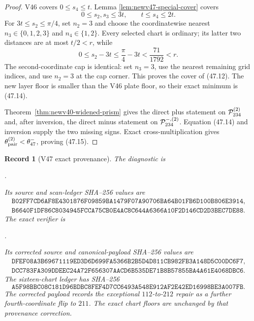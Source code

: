 \documentclass[11pt,oneside]{article}
\newtheorem{record}[theorem]{Record}
\theoremstyle{definition}
\theoremstyle{remark}
\begin{document}
\begin{proof}
V46 covers \(0\le s_4\le t\).  Lemma
\ref{lem:newv47-special-cover} covers
\[
 0\le s_2,s_3\le3t,\qquad t\le s_4\le2t.              \tag{47.16}
\]
For \(3t\le s_2\le\pi/4\), set \(n_2=3\) and choose the
coordinatewise nearest \(n_3\in\{0,1,2,3\}\) and
\(n_4\in\{1,2\}\).  Every selected chart is ordinary; its latter
two distances are at most \(t/2<r\), while
\[
 0\le s_2-3t\le\frac{\pi}{4}-3t
 <\frac{71}{1792}<r.                                  \tag{47.17}
\]
The second-coordinate cap is identical: set \(n_3=3\), use the
nearest remaining grid indices, and use \(n_2=3\) at the cap
corner.  This proves the cover of (47.12).  The new layer floor is
smaller than the V46 plate floor, so their exact minimum is
(47.14).

Theorem~\ref{thm:newv40-widened-prism} gives the direct plus
statement on \({\cal P}_{234}^{(2)}\) and, after inversion, the
direct minus statement on \({\cal P}_{234}^{-,(2)}\).  Equation
(47.14) and inversion supply the two missing signs.  Exact
cross-multiplication gives
\(\theta_{\rm pair}^{(2)}<\theta_{47}^{-}\), proving (47.15).
\end{proof}

\begin{record}[V47 exact provenance]
\label{rec:newv47-provenance}
The diagnostic is
\begin{center}
\footnotesize
{}.
\end{center}
Its source and scan-ledger SHA--256 values are
\[
\begin{gathered}
\texttt{B02FF7CD6AF8E4301876F09859BA1479F07A90706BA64B01FB6D100B806E3914},\\
\texttt{B6640F1DF86C8034945FCCA75CB0E4AC8C644A6366A10F2D146CD2D3BEC7DE88}.
\end{gathered}                                         \tag{47.18}
\]
The exact verifier is
\begin{center}
\footnotesize
{}.
\end{center}
Its corrected source and canonical-payload SHA--256 values are
\[
\begin{gathered}
\texttt{DFEF08A3B69671119ED3D6D699FA5366B2B5D4D811CB982FB3A148D5C00DC6F7},\\
\texttt{DCC783FA309DDEEC24A72F656307AACD6B535DE71B8B57855BA4A61E4068DBC6}.
\end{gathered}                                         \tag{47.19}
\]
The sixteen-chart ledger has SHA--256
\[
\texttt{A5F98BBC08C181D96BDBC8FEF4D7CC6493A548E912AF2E42ED16998BE3A007FB}.
                                                               \tag{47.20}
\]
The corrected payload records the exceptional \(112\)-to-\(212\)
repair as a further fourth-coordinate flip to \(211\).  The exact
chart floors are unchanged by that provenance correction.
\end{record}
\end{document}
